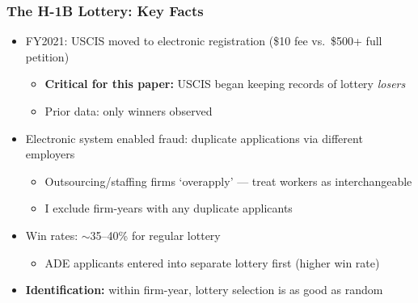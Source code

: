 \documentclass[xcolor=dvipsnames, compress, 12pt, aspectratio=169, presentation]{beamer}
\begin{document}
\begin{frame}
    \frametitle{The H-1B Lottery: Key Facts}
    \begin{itemize}
        \item FY2021: USCIS moved to electronic registration (\$10 fee vs.\ \$500+ full petition)
        \begin{itemize}
            \item \textcolor{maincolor}{\textbf{Critical for this paper:}} USCIS began keeping records of lottery \textit{losers}
            \item Prior data: only winners observed
        \end{itemize}
        \vspace{3mm}
        \item Electronic system enabled fraud: duplicate applications via different employers
        \begin{itemize}
            \item Outsourcing/staffing firms `overapply' --- treat workers as interchangeable
            \item I exclude firm-years with any duplicate applicants
        \end{itemize}
        \vspace{3mm}
        \item Win rates: $\sim$35--40\% for regular lottery
        \begin{itemize}
            \item ADE applicants entered into separate lottery first (higher win rate)
        \end{itemize}
        \vspace{3mm}
        \item \textbf{Identification:} within firm-year, lottery selection is as good as random
    \end{itemize}
\end{frame}
\end{document}
